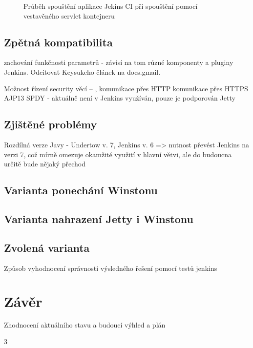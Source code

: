             \begin{figure}[ht]
                \begin{center}
                    \caption{Průběh spouštění aplikace Jekins CI při spouštění pomocí vestavěného servlet kontejneru}
                    \label{imgArchitekturaSpusteni}
                \end{center}
            \end{figure}

        


    \section{Zpětná kompatibilita}
        zachování funkčnosti parametrů - závisí na tom různé komponenty a pluginy Jenkins. 
        Odcitovat Keysukeho článek na docs.gmail.  
        
        Možnost řízení security věcí -- \cite{securityArchitecture}, \cite{securityArchitectureWinstone}
        komunikace přes HTTP
        komunikace přes HTTPS
        AJP13     
        SPDY - aktuálně není v Jenkins využíván, pouze je podporován Jetty


    \section{Zjištěné problémy}
        Rozdílná verze Javy - Undertow v. 7, Jenkins v. 6 => nutnost převést Jenkins na verzi 7,
        což mírně omezuje okamžité využití v hlavní větvi, ale do budoucna určitě bude nějaký přechod

    \section{Varianta ponechání Winstonu}

    \section{Varianta nahrazení Jetty i Winstonu}

    \section{Zvolená varianta}
        Způsob vyhodnocení správnosti výsledného řešení pomocí testů jenkins



\chapter{Závěr}
    Zhodnocení aktuálního stavu a budoucí výhled a plán



3

